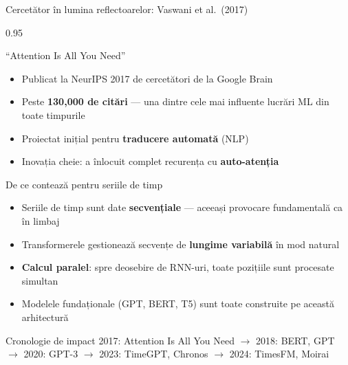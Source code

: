 \documentclass[9pt, aspectratio=169, t]{beamer}
\begin{document}
\begin{frame}{Cercetător în lumina reflectoarelor: Vaswani et al.\ (2017)}
    \begin{cminipage}{0.95\textwidth}
    \vspace{-2mm}
    \begin{block}{``Attention Is All You Need''}
        {\small
        \begin{itemize}\setlength{\itemsep}{0pt}
            \item Publicat la NeurIPS 2017 de cercetători de la Google Brain
            \item Peste \textbf{130{,}000 de citări} --- una dintre cele mai influente lucrări ML din toate timpurile
            \item Proiectat inițial pentru \textbf{traducere automată} (NLP)
            \item Inovația cheie: a înlocuit complet recurența cu \textbf{auto-atenția}
        \end{itemize}
        }
    \end{block}
    \vspace{-2mm}
    \begin{alertblock}{De ce contează pentru seriile de timp}
        {\small
        \begin{itemize}\setlength{\itemsep}{0pt}
            \item Seriile de timp sunt date \textbf{secvențiale} --- aceeași provocare fundamentală ca în limbaj
            \item Transformerele gestionează secvențe de \textbf{lungime variabilă} în mod natural
            \item \textbf{Calcul paralel}: spre deosebire de RNN-uri, toate pozițiile sunt procesate simultan
            \item Modelele fundaționale (GPT, BERT, T5) sunt toate construite pe această arhitectură
        \end{itemize}
        }
    \end{alertblock}
    \vspace{-2mm}
    \begin{exampleblock}{Cronologie de impact}
        {\small 2017: Attention Is All You Need $\to$ 2018: BERT, GPT $\to$ 2020: GPT-3 $\to$ 2023: TimeGPT, Chronos $\to$ 2024: TimesFM, Moirai}
    \end{exampleblock}
    \end{cminipage}
\end{frame}
\end{document}
